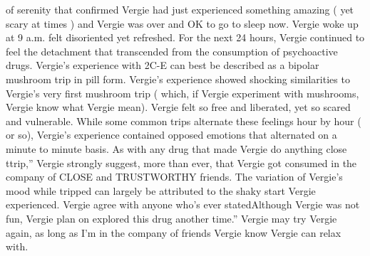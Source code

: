 \documentclass[12pt]{book}
\begin{document}
of serenity that confirmed Vergie had just experienced something amazing (  yet scary at times ) and Vergie was over and OK to go to sleep now. Vergie woke up at 9 a.m. felt disoriented yet refreshed. For the next 24 hours, Vergie continued to feel the detachment that transcended from the consumption of psychoactive drugs. Vergie's experience with 2C-E can best be described as a bipolar mushroom trip in pill form. Vergie's experience showed shocking similarities to Vergie's very first mushroom trip ( which, if Vergie experiment with mushrooms, Vergie know what Vergie mean). Vergie felt so free and liberated, yet so scared and vulnerable. While some common trips alternate these feelings hour by hour ( or so), Vergie's experience contained opposed emotions that alternated on a minute to minute basis. As with any drug that made Vergie do anything close ttrip,'' Vergie strongly suggest, more than ever, that Vergie got consumed in the company of CLOSE and TRUSTWORTHY friends. The variation of Vergie's mood while tripped can largely be attributed to the shaky start Vergie experienced. Vergie agree with anyone who's ever statedAlthough Vergie was not fun, Vergie plan on explored this drug another time.'' Vergie may try Vergie again, as long as I'm in the company of friends Vergie know Vergie can relax with.
\end{document}

